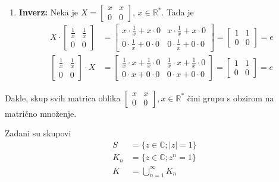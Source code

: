 \documentclass{exam}
\begin{document}
\begin{questions}
\begin{solution}
\begin{enumerate}
    \item \textbf{Inverz:} Neka je $\displaystyle X =
      \begin{bmatrix}
        x & x\\
        0 & 0
      \end{bmatrix}$, $x \in \mathbb{R}^*$. Tada je
      \begin{align*}
        X \cdot
        \begin{bmatrix}
          \frac{1}{x} & \frac{1}{x}\\
          0 & 0
        \end{bmatrix} &=
        \begin{bmatrix}
          x \cdot \frac{1}{x} + x \cdot 0 & x \cdot \frac{1}{x} + x \cdot 0\\
          0 \cdot \frac{1}{x} + 0 \cdot 0 & 0 \cdot \frac{1}{x} + 0 \cdot 0
        \end{bmatrix} =
        \begin{bmatrix}
          1 & 1\\
          0 & 0
        \end{bmatrix} = e\\
        \begin{bmatrix}
          \frac{1}{x} & \frac{1}{x}\\
          0 & 0
        \end{bmatrix} \cdot X &=
        \begin{bmatrix}
          \frac{1}{x} \cdot x + \frac{1}{x} \cdot 0 & \frac{1}{x} \cdot x + \frac{1}{x} \cdot 0\\
          0 \cdot x + 0 \cdot 0 & 0 \cdot x + 0 \cdot 0
        \end{bmatrix} =
        \begin{bmatrix}
          1 & 1\\
          0 & 0
        \end{bmatrix} = e
      \end{align*}
  \end{enumerate}
  Dakle, skup svih matrica oblika $\displaystyle
  \begin{bmatrix}
    x & x\\
    0 & 0
  \end{bmatrix}, x \in \mathbb{R}^*$ čini grupu s obzirom na matrično množenje.
\end{solution}

\question Zadani su skupovi
\begin{align*}
  S &= \{z \in \mathbb{C}; |z| = 1\}\\
  K_n &= \{z \in \mathbb{C}; z^n = 1\}\\
  K &= \bigcup_{n=1}^{\infty} K_n
\end{align*}


\end{questions}
\end{document}
